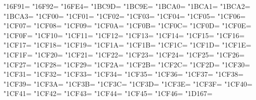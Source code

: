 \XeTeXcharclass"16F91=\KclassNum
\XeTeXcharclass"16F92=\KclassNum
\XeTeXcharclass"16FE4=\KclassNum
\XeTeXcharclass"1BC9D=\KclassNum
\XeTeXcharclass"1BC9E=\KclassNum
\XeTeXcharclass"1BCA0=\KclassNum
\XeTeXcharclass"1BCA1=\KclassNum
\XeTeXcharclass"1BCA2=\KclassNum
\XeTeXcharclass"1BCA3=\KclassNum
\XeTeXcharclass"1CF00=\KclassNum
\XeTeXcharclass"1CF01=\KclassNum
\XeTeXcharclass"1CF02=\KclassNum
\XeTeXcharclass"1CF03=\KclassNum
\XeTeXcharclass"1CF04=\KclassNum
\XeTeXcharclass"1CF05=\KclassNum
\XeTeXcharclass"1CF06=\KclassNum
\XeTeXcharclass"1CF07=\KclassNum
\XeTeXcharclass"1CF08=\KclassNum
\XeTeXcharclass"1CF09=\KclassNum
\XeTeXcharclass"1CF0A=\KclassNum
\XeTeXcharclass"1CF0B=\KclassNum
\XeTeXcharclass"1CF0C=\KclassNum
\XeTeXcharclass"1CF0D=\KclassNum
\XeTeXcharclass"1CF0E=\KclassNum
\XeTeXcharclass"1CF0F=\KclassNum
\XeTeXcharclass"1CF10=\KclassNum
\XeTeXcharclass"1CF11=\KclassNum
\XeTeXcharclass"1CF12=\KclassNum
\XeTeXcharclass"1CF13=\KclassNum
\XeTeXcharclass"1CF14=\KclassNum
\XeTeXcharclass"1CF15=\KclassNum
\XeTeXcharclass"1CF16=\KclassNum
\XeTeXcharclass"1CF17=\KclassNum
\XeTeXcharclass"1CF18=\KclassNum
\XeTeXcharclass"1CF19=\KclassNum
\XeTeXcharclass"1CF1A=\KclassNum
\XeTeXcharclass"1CF1B=\KclassNum
\XeTeXcharclass"1CF1C=\KclassNum
\XeTeXcharclass"1CF1D=\KclassNum
\XeTeXcharclass"1CF1E=\KclassNum
\XeTeXcharclass"1CF1F=\KclassNum
\XeTeXcharclass"1CF20=\KclassNum
\XeTeXcharclass"1CF21=\KclassNum
\XeTeXcharclass"1CF22=\KclassNum
\XeTeXcharclass"1CF23=\KclassNum
\XeTeXcharclass"1CF24=\KclassNum
\XeTeXcharclass"1CF25=\KclassNum
\XeTeXcharclass"1CF26=\KclassNum
\XeTeXcharclass"1CF27=\KclassNum
\XeTeXcharclass"1CF28=\KclassNum
\XeTeXcharclass"1CF29=\KclassNum
\XeTeXcharclass"1CF2A=\KclassNum
\XeTeXcharclass"1CF2B=\KclassNum
\XeTeXcharclass"1CF2C=\KclassNum
\XeTeXcharclass"1CF2D=\KclassNum
\XeTeXcharclass"1CF30=\KclassNum
\XeTeXcharclass"1CF31=\KclassNum
\XeTeXcharclass"1CF32=\KclassNum
\XeTeXcharclass"1CF33=\KclassNum
\XeTeXcharclass"1CF34=\KclassNum
\XeTeXcharclass"1CF35=\KclassNum
\XeTeXcharclass"1CF36=\KclassNum
\XeTeXcharclass"1CF37=\KclassNum
\XeTeXcharclass"1CF38=\KclassNum
\XeTeXcharclass"1CF39=\KclassNum
\XeTeXcharclass"1CF3A=\KclassNum
\XeTeXcharclass"1CF3B=\KclassNum
\XeTeXcharclass"1CF3C=\KclassNum
\XeTeXcharclass"1CF3D=\KclassNum
\XeTeXcharclass"1CF3E=\KclassNum
\XeTeXcharclass"1CF3F=\KclassNum
\XeTeXcharclass"1CF40=\KclassNum
\XeTeXcharclass"1CF41=\KclassNum
\XeTeXcharclass"1CF42=\KclassNum
\XeTeXcharclass"1CF43=\KclassNum
\XeTeXcharclass"1CF44=\KclassNum
\XeTeXcharclass"1CF45=\KclassNum
\XeTeXcharclass"1CF46=\KclassNum
\XeTeXcharclass"1D167=\KclassNum
